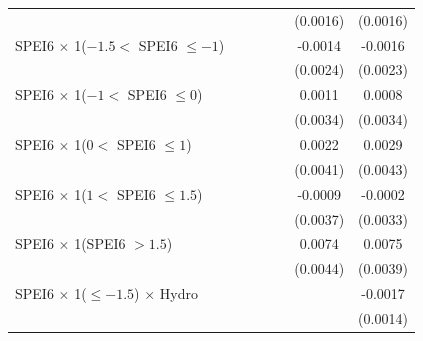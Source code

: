 {\begin{tabular}{l*{6}{c}}
                    &                     &                     &                     &                     &    (0.0016)         &    (0.0016)         \\
\addlinespace
SPEI6 $\times$ 1($-1.5 <$ SPEI6 $\leq -1$)&                     &                     &                     &                     &     -0.0014         &     -0.0016         \\
                    &                     &                     &                     &                     &    (0.0024)         &    (0.0023)         \\
\addlinespace
SPEI6 $\times$ 1($-1 <$ SPEI6 $\leq 0$)&                     &                     &                     &                     &      0.0011         &      0.0008         \\
                    &                     &                     &                     &                     &    (0.0034)         &    (0.0034)         \\
\addlinespace
SPEI6 $\times$ 1($0 <$ SPEI6 $\leq 1$)&                     &                     &                     &                     &      0.0022         &      0.0029         \\
                    &                     &                     &                     &                     &    (0.0041)         &    (0.0043)         \\
\addlinespace
SPEI6 $\times$ 1($1 <$ SPEI6 $\leq 1.5$)&                     &                     &                     &                     &     -0.0009         &     -0.0002         \\
                    &                     &                     &                     &                     &    (0.0037)         &    (0.0033)         \\
\addlinespace
SPEI6 $\times$ 1(SPEI6 $> 1.5$)&                     &                     &                     &                     &      0.0074         &      0.0075\sym{*}  \\
                    &                     &                     &                     &                     &    (0.0044)         &    (0.0039)         \\
\addlinespace
SPEI6 $\times$ 1($\leq -1.5$) $\times$ Hydro&                     &                     &                     &                     &                     &     -0.0017         \\
                    &                     &                     &                     &                     &                     &    (0.0014)         \\

\end{tabular}}
